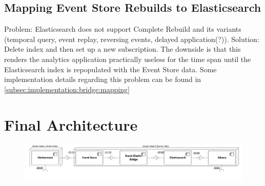 \subsection{Mapping Event Store Rebuilds to Elasticsearch}
\label{subsec:design:bridge:mapping}

Problem: Elasticsearch does not support Complete Rebuild and its variants (temporal query, event replay, reversing events, delayed application(?)).
Solution: Delete index and then set up a new subscription.
The downside is that this renders the analytics application practically useless for the time span until the Elasticsearch index is repopulated with the Event Store data.
Some implementation details regarding this problem can be found in \cref{subsec:implementation:bridge:mapping}

\section{Final Architecture}

\begin{figure}[htb]
        \includegraphics[width=\textwidth]{gfx/docker-architecture.pdf}
        \caption{}
        \label{}
\end{figure}





































